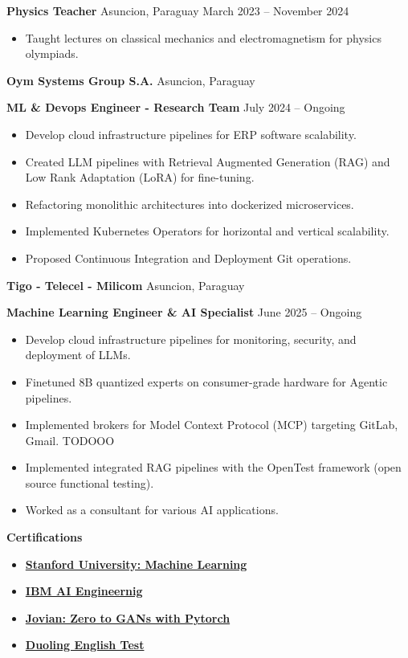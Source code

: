 \documentclass[11pt]{article}
\begin{document}
\textbf{Physics Teacher}	\hfill Asuncion, Paraguay
\hfill March 2023 – November 2024
\begin{itemize}[noitemsep]
  \item Taught lectures on classical mechanics and electromagnetism for physics olympiads.
\end{itemize}

\textbf{Oym Systems Group S.A.}	\hfill Asuncion, Paraguay

\textbf{ML \& Devops Engineer - Research Team} \hfill July 2024 – Ongoing
\begin{itemize}[noitemsep]
  \item Develop cloud infrastructure pipelines for ERP software scalability.
  \item Created LLM pipelines with Retrieval Augmented Generation (RAG) and Low Rank Adaptation (LoRA) for fine-tuning.
  \item Refactoring monolithic architectures into dockerized microservices.
  \item Implemented Kubernetes Operators for horizontal and vertical scalability.
  \item Proposed Continuous Integration and Deployment Git operations.
\end{itemize}

\textbf{Tigo - Telecel - Milicom}	\hfill Asuncion, Paraguay

\textbf{Machine Learning Engineer \& AI Specialist} \hfill June 2025 – Ongoing
\begin{itemize}[noitemsep]
  \item Develop cloud infrastructure pipelines for monitoring, security, and deployment of LLMs.
  \item Finetuned 8B quantized experts on consumer-grade hardware for Agentic pipelines.
  \item Implemented brokers for Model Context Protocol (MCP) targeting GitLab, Gmail. TODOOO
  \item Implemented integrated RAG pipelines with the OpenTest framework (open source functional testing).
  \item Worked as a consultant for various AI applications.
\end{itemize}

\begin{center}
    \textbf{Certifications}
\end{center}

\begin{itemize}
    \item \href{https://www.coursera.org/account/accomplishments/specialization/certificate/VNCPL4MXPB5A}{\textbf{Stanford University: Machine Learning}}
    \item \href{https://www.coursera.org/account/accomplishments/specialization/certificate/JEYSUHXTCYU5}{\textbf{IBM AI Engineernig}}
    \item \href{https://jovian.com/certificate/MFQTQMZXGM}{\textbf{Jovian: Zero to GANs with Pytorch}}
    \item \href{https://certs.duolingo.com/vc54x03gh7zcprnd}{\textbf{Duoling English Test}}
\end{itemize}
\end{document}
